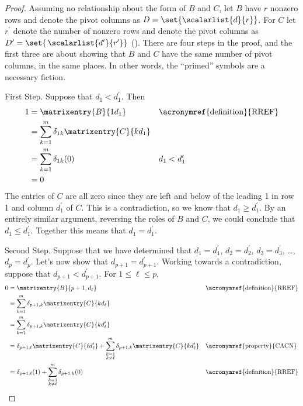 \begin{proof}
%
Assuming no relationship about the form of $B$ and $C$, let $B$ have $r$ nonzero rows and denote the pivot columns as $D=\set{\scalarlist{d}{r}}$.  For $C$ let $r^\prime$ denote the number of nonzero rows and denote the pivot columns 
as
$D^\prime=\set{\,\scalarlist{d^\prime}{r^\prime}}$ ().  There are four steps in the proof, and the first three are about showing that $B$ and $C$ have the same number of pivot columns, in the same places.  In other words, the ``primed'' symbols are a necessary fiction.\par
%
First Step.  Suppose that $d_1<d^\prime_1$.  Then
%
\begin{align*}
1
&=\matrixentry{B}{1d_1}
&&\text{\acronymref{definition}{RREF}}\\
%
&=\sum_{k=1}^{m}\delta_{1k}\matrixentry{C}{kd_1}\\
%
&=\sum_{k=1}^{m}\delta_{1k}(0)
&&d_1<d^\prime_1\\
%
&=0
\end{align*}
%
The entries of $C$ are all zero since they are left and below of the leading 1 in row 1 and column $d^\prime_1$ of $C$.  This is a contradiction, so we know that $d_1\geq d^\prime_1$.  By an entirely similar argument, reversing the roles of $B$ and $C$, we could conclude that $d_1\leq d^\prime_1$.  Together this means that $d_1=d^\prime_1$.\par
%
Second Step.  Suppose that we have determined that $d_1=d^\prime_1$, $d_2=d^\prime_2$, $d_3=d^\prime_3$, \dots, $d_p=d^\prime_p$.  Let's now show that $d_{p+1}=d^\prime_{p+1}$.  Working towards a contradiction, suppose that $d_{p+1}<d^\prime_{p+1}$.  For $1\leq\ell\leq p$,
%
\begin{align*}
0
&=\matrixentry{B}{p+1,d_\ell}
&&\text{\acronymref{definition}{RREF}}\\
%
&=\sum_{k=1}^{m}\delta_{p+1,k}\matrixentry{C}{kd_\ell}\\
%
&=\sum_{k=1}^{m}\delta_{p+1,k}\matrixentry{C}{kd^\prime_\ell}\\
%
&=
\delta_{p+1,\ell}\matrixentry{C}{\ell d^\prime_\ell}+
\sum_{\substack{k=1\\k\neq\ell}}^{m}\delta_{p+1,k}\matrixentry{C}{kd^\prime_\ell}
&&\text{\acronymref{property}{CACN}}\\
%
&=
\delta_{p+1,\ell}(1)+
\sum_{\substack{k=1\\k\neq\ell}}^{m}\delta_{p+1,k}(0)
&&\text{\acronymref{definition}{RREF}}\\

\end{align*}
\end{proof}
